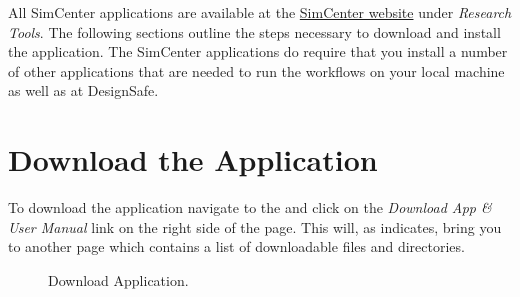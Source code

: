 All SimCenter applications are available at
the \href{https://simcenter.designsafe-ci.org/research-tools/overview/}{SimCenter
website} under \emph{Research Tools}. The following sections outline
the steps necessary to download and install the \texttt{\getsoftwarename{}}
application. The SimCenter applications do require that you install a
number of other applications that are needed to run the workflows on
your local machine as well as at DesignSafe. \\


\section{Download the Application}


To download the \texttt{\getsoftwarename{}} application navigate to
the  and click on
the \emph{Download App \& User Manual} link on the right side of the
page. This will, as  indicates, bring you to another page which contains a list of downloadable files and directories.

\begin{figure}[!htbp]
  \caption{Download Application.}
  \label{fig:app_choose_file}
\end{figure}


